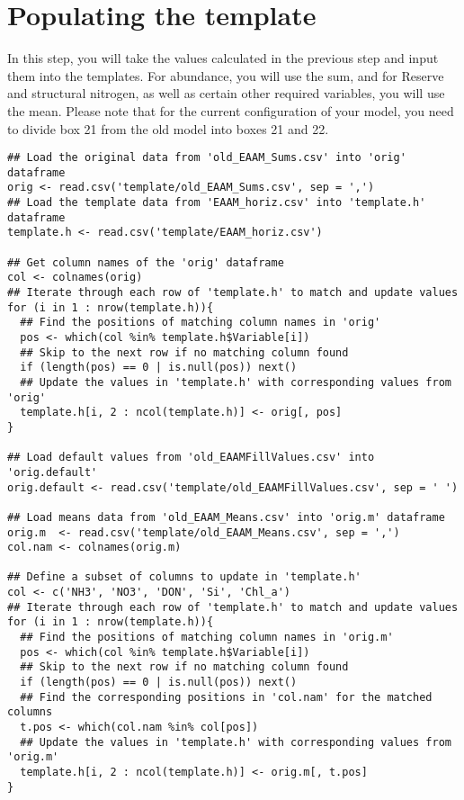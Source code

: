 \documentclass[a4paper]{article}
\begin{document}
\section{Populating the template}
\label{sec:org95b8a86}
In this step, you will take the values calculated in the previous step and input
them into the templates. For abundance, you will use the sum, and for Reserve and
structural nitrogen, as well as certain other required variables, you will use the
mean. Please note that for the current configuration of your model, you need to
divide box 21 from the old model into boxes 21 and 22.
\begin{verbatim}
## Load the original data from 'old_EAAM_Sums.csv' into 'orig' dataframe
orig <- read.csv('template/old_EAAM_Sums.csv', sep = ',')
## Load the template data from 'EAAM_horiz.csv' into 'template.h' dataframe
template.h <- read.csv('template/EAAM_horiz.csv')

## Get column names of the 'orig' dataframe
col <- colnames(orig)
## Iterate through each row of 'template.h' to match and update values
for (i in 1 : nrow(template.h)){
  ## Find the positions of matching column names in 'orig'
  pos <- which(col %in% template.h$Variable[i])
  ## Skip to the next row if no matching column found
  if (length(pos) == 0 | is.null(pos)) next()
  ## Update the values in 'template.h' with corresponding values from 'orig'
  template.h[i, 2 : ncol(template.h)] <- orig[, pos]
}

## Load default values from 'old_EAAMFillValues.csv' into 'orig.default'
orig.default <- read.csv('template/old_EAAMFillValues.csv', sep = ' ')

## Load means data from 'old_EAAM_Means.csv' into 'orig.m' dataframe
orig.m  <- read.csv('template/old_EAAM_Means.csv', sep = ',')
col.nam <- colnames(orig.m)

## Define a subset of columns to update in 'template.h'
col <- c('NH3', 'NO3', 'DON', 'Si', 'Chl_a')
## Iterate through each row of 'template.h' to match and update values
for (i in 1 : nrow(template.h)){
  ## Find the positions of matching column names in 'orig.m'
  pos <- which(col %in% template.h$Variable[i])
  ## Skip to the next row if no matching column found
  if (length(pos) == 0 | is.null(pos)) next()
  ## Find the corresponding positions in 'col.nam' for the matched columns
  t.pos <- which(col.nam %in% col[pos])
  ## Update the values in 'template.h' with corresponding values from 'orig.m'
  template.h[i, 2 : ncol(template.h)] <- orig.m[, t.pos]
}


\end{verbatim}
\end{document}
